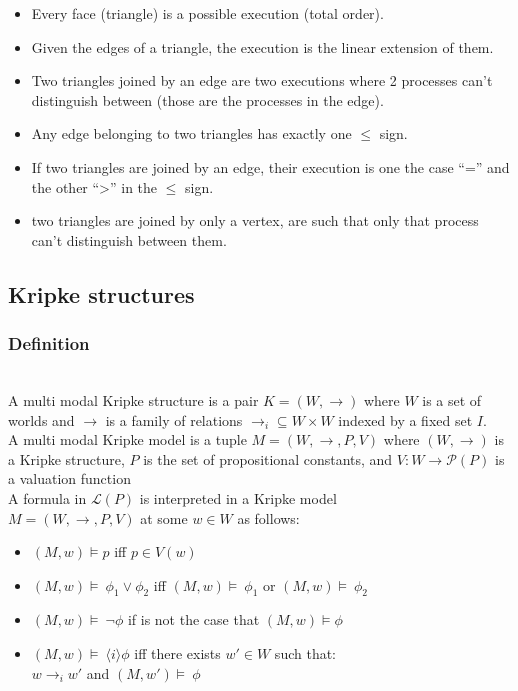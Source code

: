 \documentclass{tufte-book} %
\begin{document}
\begin{itemize}[topsep=0pt,itemsep=-1ex,partopsep=1ex,parsep=1ex]
\item Every face (triangle) is a possible execution (total order).
\item Given the edges of a triangle, the execution is the linear extension of them.
\item Two triangles joined by an edge are two executions where 2 processes can't distinguish between (those are the processes in the edge).
\item Any edge belonging to two triangles has exactly one $\le$ sign.
\item If two triangles are joined by an edge, their execution is one the case ``='' and the other ``>'' in the $\le$ sign.
\item two triangles are joined by only a vertex, are such that only that process can't distinguish between them.
\end{itemize}


\subsection{Kripke structures}

\subsubsection{Definition}\\

A multi modal Kripke structure is a pair $K = (W, \rightarrow)$ where $W$ is a set of worlds and $\rightarrow$ is a family of relations $\rightarrow_i \subseteq W \times W$ indexed by a fixed set $I$.\\

A multi modal Kripke model is a tuple $M=(W,\rightarrow,P,V)$ where $(W, \rightarrow)$ is a Kripke structure, $P$ is the set of propositional constants, and $V:W\rightarrow \mathcal{P}(P)$ is a valuation function\\

A formula in $\mathcal{L}(P)$ is interpreted in a Kripke model \\
$M=(W,\rightarrow,P,V)$ at some $w\in W$ as follows:
\begin{itemize}[topsep=0pt,itemsep=-1ex,partopsep=1ex,parsep=1ex]
\item $(M,w) \models p$ iff $p\in V(w)$
\item $(M,w) \models \ \phi_1 \vee \phi_2$ iff $(M,w) \models \ \phi_1$ or $(M,w) \models \ \phi_2$
\item $(M,w) \models \ \neg\phi$ if is not the case that $(M,w) \models \phi$
\item $(M,w) \models \ \langle i \rangle \phi$ iff there exists $w'\in W$ such that:\\ $w\rightarrow_i w'$ and  $(M,w') \models \ \phi$
\end{itemize}
\end{document}
